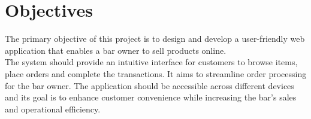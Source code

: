 \section{Objectives}

The primary objective of this project is to design and develop a user-friendly web application that enables a bar owner to sell products online.\\
The system should provide an intuitive interface for customers to browse items, place orders and complete the transactions. It aims to streamline order processing for the bar owner.
The application should be accessible across different devices and its goal is to enhance customer convenience while increasing the bar's sales and operational efficiency.